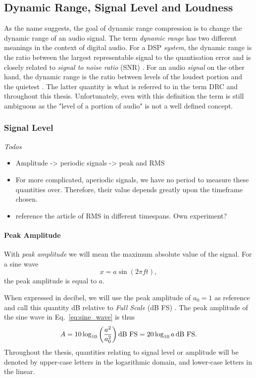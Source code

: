 \documentclass[../main2.tex]{subfiles}
\begin{document}
\subsection{Dynamic Range, Signal Level and Loudness}
As the name suggests, the goal of dynamic range compression is to change the dynamic range of an audio signal. The term \emph{dynamic range} has two different meanings in the context of digital audio. For a DSP \emph{system}, the dynamic range is the ratio between the largest representable signal to the quantisation error and is closely related to \emph{signal to noise ratio} (SNR)  \cite{wilson1993filter}. For an audio \emph{signal} on the other hand, the dynamic range is the ratio between levels of the loudest portion and the quietest \cite{davis1989sound}. The latter quantity is what is referred to in the term DRC and throughout this thesis. Unfortunately, even with this definition the term is still ambiguous as the "level of a portion of audio" is not a well defined concept.

\subsubsection{Signal Level}
\emph{Todos}
\begin{itemize}
\item Amplitude -> periodic signals -> peak and RMS
\item For more complicated, aperiodic signals, we have no period to measure these quantities over. Therefore, their value depends greatly upon the timeframe chosen.
\item reference the article of RMS in different timespans. Own experiment?
\end{itemize}

\paragraph{Peak Amplitude}
With \emph{peak amplitude} we will mean the maximum absolute value of the signal. For a sine wave
\begin{equation}\label{eq:sine_wave}
x = a \sin(2 \pi f t),
\end{equation}
the peak amplitude is equal to $a$.

When expressed in decibel, we will use the peak amplitude of $a_0=1$ as reference and call this quantity dB relative to \emph{Full Scale} (dB FS) \cite{XXXX}. The peak amplitude of the sine wave in Eq.~\eqref{eq:sine_wave} is thus
\begin{equation}
A = 10 \log_{10} \left( \frac{a^2}{a_0^2} \right) \text{dB FS} = 20 \log_{10} a \mskip3mu\text{dB FS}.
\end{equation}
Throughout the thesis, quantities relating to signal level or amplitude will be denoted by upper-case letters in the logarithmic domain, and lower-case letters in the linear.
\end{document}
